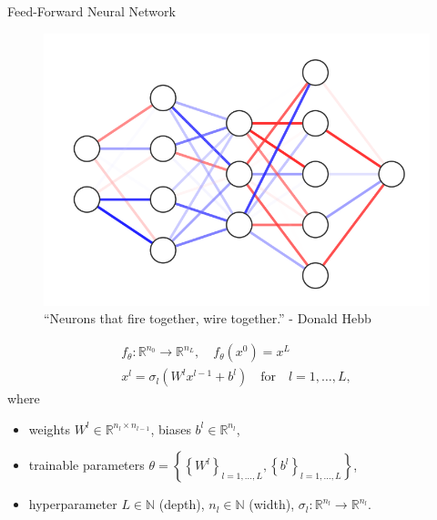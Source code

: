 \documentclass[9pt]{beamer}
\begin{document}
\begin{frame}{Feed-Forward Neural Network}
    \begin{figure}[H]
        \begin{center}
            \includegraphics[scale=0.35]{img/Neural Network.png}
        \end{center}
        \caption{“Neurons that fire together, wire together.” - Donald Hebb}
    \end{figure}
    \begin{equation*}
        \begin{gathered}
            f_{\theta} \colon \mathbb{R}^{n_0} \to \mathbb{R}^{n_L}, \quad f_{\theta} \left( x^{0}\right) = x^{L} \\
            x^{l} = \sigma_l \left( W^l x^{l-1} + b^l \right) \quad \text{for} \quad l = 1, \ldots, L, 
        \end{gathered}
    \end{equation*}
    where 
    \begin{itemize}
        \item weights $W^l \in \mathbb{R}^{n_l \times n_{l-1}}$, biases $b^l \in \mathbb{R}^{n_l}$,
        \item trainable parameters $\theta = \left\{ \left\{ W^l \right\}_{l=1, \ldots, L}, \left\{ b^l \right\}_{l=1, \ldots, L} \right\}$,
        \item hyperparameter $L \in \mathbb{N}$ (depth), $n_l \in \mathbb{N}$ (width), $\sigma_l \colon \mathbb{R}^{n_l} \to \mathbb{R}^{n_l}$.
    \end{itemize}

\end{frame}
\end{document}
